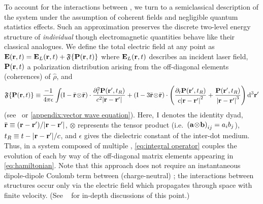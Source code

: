 To account for the interactions between \qds{}, we turn to a semiclassical description of the system under the assumption of coherent fields and negligible quantum  statistics effects.
Such an approximation preserves the discrete two-level energy structure of \emph{individual} \qds{} though electromagnetic quantities behave like their classical analogues.
We define the total electric field at any point as $\vb{E}(\vb{r}, t) = \vb{E}_L(\vb{r}, t) + \mathfrak{F}\{ \vb{P}(\vb{r}, t) \}$
where $\vb{E}_L(\vb{r}, t)$ describes an incident laser field, $\vb{P}(\vb{r}, t)$ a polarization distribution arising from  the off-diagonal elements (coherences) of $\hat{\rho}$, and
\begin{equation}
    \mathfrak{F}\{\vb{P}(\vb{r}, t)\} \equiv
    \frac{-1}{4\pi \epsilon} \int_{}
      \left(\mathrm{I} -  \bar{\vb{r}} \! \otimes \! \bar{\vb{r}} \right) \cdot \frac{\partial_t^2 \vb{P}(\vb{r}', t_R)}{c^2 \abs{\vb{r}-\vb{r}'}} + 
      \left(\mathrm{I} - 3\bar{\vb{r}} \! \otimes \! \bar{\vb{r}} \right) \cdot \qty(
        \frac{\partial_t   \vb{P}(\vb{r}', t_R)}{c \abs{\vb{r}-\vb{r}'}^2} +
        \frac{             \vb{P}(\vb{r}', t_R)}{  \abs{\vb{r}-\vb{r}'}^3}
      ) \dd[3]{\vb{r}'}
  \label{eq:integral operator}
\end{equation}
(see~\cite[section \S 72]{Landau2013} or \cref{appendix:vector wave equation}).
Here, $\mathrm{I}$ denotes the identity dyad, $\bar{\vb{r}} \equiv \qty(\vb{r} - \vb{r}')/\abs{\vb{r} - \vb{r}'}$, $\otimes$ represents the tensor product (i.e.\ $\qty(\vb{a} \! \otimes \! \vb{b})_{ij} = a_i b_j$), $t_R \equiv t - \abs{\vb{r} - \vb{r}'}/c$, and $\epsilon$ gives the dielectric constant of the inter-dot medium.
Thus, in a system composed of multiple \qds{}, \cref{eq:integral operator} couples the evolution of each \qd{} by way of the off-diagonal matrix elements appearing in \cref{eq:hamiltonian}.
Note that this approach does not require an instantaneous dipole-dipole Coulomb term between (charge-neutral) \qds{}; the interactions between structures occur only via the electric field which propagates through space with finite velocity.
(See ~\cite[sections {A}$_{\textsc{iv}}$ and {C}$_{\textsc{iv}}$]{Cohen1989} for in-depth discussions of this point.)


